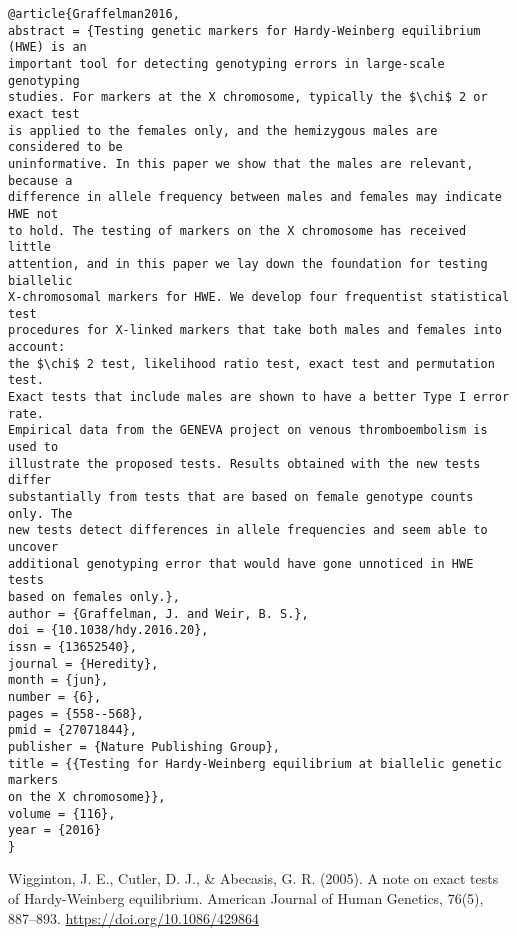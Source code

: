 \documentclass[]{article}
\begin{document}
\begin{verbatim}
@article{Graffelman2016,
abstract = {Testing genetic markers for Hardy-Weinberg equilibrium (HWE) is an
important tool for detecting genotyping errors in large-scale genotyping
studies. For markers at the X chromosome, typically the $\chi$ 2 or exact test
is applied to the females only, and the hemizygous males are considered to be
uninformative. In this paper we show that the males are relevant, because a
difference in allele frequency between males and females may indicate HWE not
to hold. The testing of markers on the X chromosome has received little
attention, and in this paper we lay down the foundation for testing biallelic
X-chromosomal markers for HWE. We develop four frequentist statistical test
procedures for X-linked markers that take both males and females into account:
the $\chi$ 2 test, likelihood ratio test, exact test and permutation test.
Exact tests that include males are shown to have a better Type I error rate.
Empirical data from the GENEVA project on venous thromboembolism is used to
illustrate the proposed tests. Results obtained with the new tests differ
substantially from tests that are based on female genotype counts only. The
new tests detect differences in allele frequencies and seem able to uncover
additional genotyping error that would have gone unnoticed in HWE tests
based on females only.},
author = {Graffelman, J. and Weir, B. S.},
doi = {10.1038/hdy.2016.20},
issn = {13652540},
journal = {Heredity},
month = {jun},
number = {6},
pages = {558--568},
pmid = {27071844},
publisher = {Nature Publishing Group},
title = {{Testing for Hardy-Weinberg equilibrium at biallelic genetic markers
on the X chromosome}},
volume = {116},
year = {2016}
}
\end{verbatim}

Wigginton, J. E., Cutler, D. J., \& Abecasis, G. R. (2005). A note on exact tests of Hardy-Weinberg equilibrium. American Journal of Human Genetics, 76(5), 887–893. \url{https://doi.org/10.1086/429864}
\end{document}
